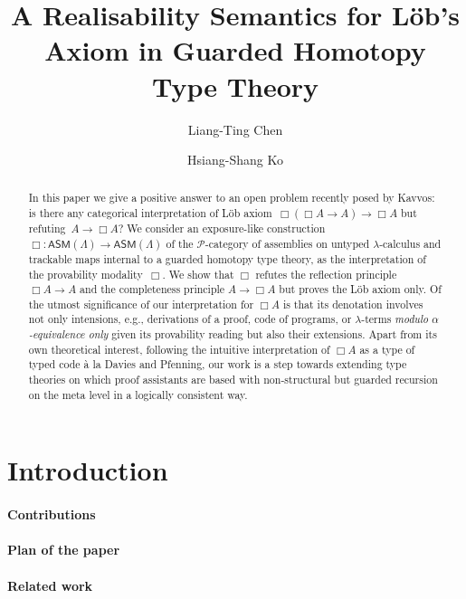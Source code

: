 \documentclass[a4paper,UKenglish,numberwithinsect,cleveref,thm-restate]{lipics-v2021}
\title{A Realisability Semantics for Löb's Axiom in Guarded Homotopy Type Theory}
\author{Liang-Ting Chen}%
  {Institute of Information Science, Academia Sinica, Taiwan~\url{https://l-tchen.github.io}}%
  {liang.ting.chen.tw@gmail.com}%
  {https://orcid.org/0000-0002-3250-1331}{}
\author{Hsiang-Shang Ko}%
  {Institute of Information Science, Academia Sinica, Taiwan~\url{https://josh-hs-ko.github.io}}%
  {joshko@iis.sinica.edu.tw}%
  {https://orcid.org/0000-0002-2439-1048}{}
\newcommand{\PP}{\mathscr{P}}
\newcommand{\ASM}{\mathsf{ASM}}
\begin{document}
\maketitle

\begin{abstract}
  In this paper we give a positive answer to an open problem recently posed by Kavvos: is there any categorical interpretation of Löb axiom~$\Box (\Box A \to A) \to \Box A$ but refuting~$A \to \Box A$?
  We consider an exposure-like construction $\Box\colon \ASM(\Lambda) \to \ASM(\Lambda)$ of the $\PP$-category of assemblies on untyped $\lambda$-calculus and trackable maps internal to a guarded homotopy type theory, as the interpretation of the provability modality~$\Box$.
  We show that $\Box$ refutes the reflection principle $\Box A \to A$ and the completeness principle $A \to \Box A$ but proves the Löb axiom only.
  Of the utmost significance of our interpretation for $\Box A$ is that its denotation involves not only intensions, e.g., derivations of a proof, code of programs, or $\lambda$-terms \emph{modulo $\alpha$-equivalence only} given its provability reading but also their extensions. 
  Apart from its own theoretical interest, following the intuitive interpretation of $\Box A$ as a type of typed code \`a la Davies and Pfenning, our work is a step towards extending type theories on which proof assistants are based with non-structural but guarded recursion on the meta level in a logically consistent way.
\end{abstract}

\section{Introduction}
\cite{Litak2014}

\paragraph*{Contributions}

\paragraph*{Plan of the paper}

\paragraph*{Related work}
\cite{Visser2019,Beklemishev2006}
\cite{Kavvos2017,Kavvos2020}
\cite{Shamkanov2014,Shamkanov2016a}
\end{document}
